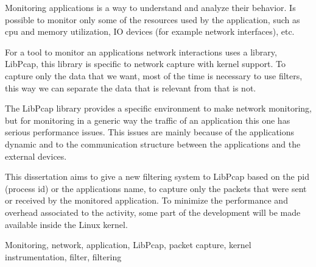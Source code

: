\abstract 
Monitoring applications is a way to understand and analyze their behavior.
Is possible to monitor only some of the resources used by the application, such as cpu and memory utilization, IO devices (for example network interfaces), etc.

For a tool to monitor an applications network interactions uses a library, LibPcap, this library is specific to network capture with kernel support.
To capture only the data that we want, most of the time is necessary to use filters, this way we can separate the data that is relevant from that is not.

The LibPcap library provides a specific environment to make network monitoring, but for monitoring in a generic way the traffic of an application this one has serious performance issues. This issues are mainly because of the applications dynamic and to the communication structure between the applications and the external devices.

This dissertation aims to give a new filtering system to LibPcap based on the pid (process id) or the applications name, to capture only the packets that were sent or received by the monitored application.
To minimize the performance and overhead associated to the activity, some part of the development will be made available inside the Linux kernel. 

\begin{keywords}
Monitoring, network, application, LibPcap, packet capture, kernel instrumentation, filter, filtering
\end{keywords} 
